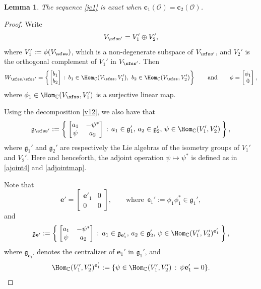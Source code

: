 \documentclass[11pt,a4paper]{amsart}
\newcommand{\CO}{{\mathcal {O}}}
\newcommand{\g}{\mathfrak g}
\newcommand{\be}{\begin {equation}}
\newcommand{\ee}{\end {equation}}
\numberwithin{equation}{section}
\newtheorem{lem}[thm]{Lemma}
\theoremstyle{remark}
\begin{document}
\begin{lem}\label{lemexact2}
The sequence \eqref{jc1} is exact when $\mathbf c_1(\CO)=\mathbf c_2(\CO)$.
\end{lem}
\begin{proof}
Write
\be\label{v12}
V_{\sfss'}=V_1'\oplus V_2',
\ee
where $V_1':=\phi(V_{\sfss})$, which is a non-degenerate subspace of $V_{\sfss'}$, and $V_2'$ is the orthogonal complement of $V_1'$ in $V_{\sfss'}$. Then
\[
   W_{\sfss, \sfss'}=\left\{\begin{bmatrix}
        b_1\\
        b_2
      \end{bmatrix} \,:\, b_1\in  \Hom_\C(V_\sfss, V_1'), \ b_2\in  \Hom_\C(V_\sfss, V_2')\right\} \qquad\textrm{and}\qquad \phi=\begin{bmatrix}
        \phi_1\\
        0
      \end{bmatrix},
\]
where $\phi_1\in \Hom_\C(V_\sfss, V_1')$ is a surjective linear map.

Using the decomposition \eqref{v12}, we also have that
\[
 \g_{\sfss'}:= \Set{\begin{bmatrix}
        a_1 & -\psi^*\\
        \psi & a_2
      \end{bmatrix}\,:\, a_1\in \g_1', \, a_2\in \g_2', \,\psi \in \Hom_\C(V_1', V_2')},
\]
where $\g_1'$ and $\g_2'$ are respectively the Lie algebras of the isometry groups of $V_1'$ and $V_2'$. Here and henceforth, the adjoint operation $\psi\mapsto \psi^*$ is defined as in
\eqref{ajoint4} and \eqref{adjointmap}.

Note that
\[
  \mathbf e'=\begin{bmatrix}
        \mathbf e'_1 & 0\\
        0 & 0
      \end{bmatrix}, \qquad \textrm{where  } \, \mathsf e_1':=\phi_1 \phi_1^*\in \g_1',%
\]
and
\[
 \g_{\mathbf e'}:= \Set{\begin{bmatrix}
        a_1 & -\psi^*\\
        \psi & a_2
      \end{bmatrix}\,:\, a_1\in \g_{\mathbf e_1'}, \, a_2\in \g_2', \,\psi \in \Hom_\C(V_1', V_2')^{\mathbf e_1'}},
\]
where $\g_{\mathbf e_1'}$ denotes the centralizer of $\mathbf e_1'$ in $\g_1'$, and
\[
   \Hom_\C(V_1', V_2')^{\mathbf e_1'}:=\{\psi\in  \Hom_\C(V_1', V_2')\,:\, \psi  {\mathbf e_1'}=0\}.
\]



\end{proof}
\end{document}
